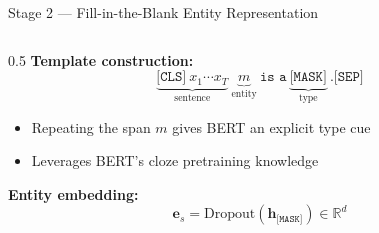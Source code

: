 \documentclass[aspectratio=169,10pt]{beamer}
\begin{document}
\begin{frame}{Stage 2 — Fill-in-the-Blank Entity Representation}
  \begin{columns}[T]
    \begin{column}{0.5\textwidth}
      \textbf{Template construction:}
      \[
        \underbrace{\texttt{[CLS]}\ x_1\cdots x_T}_{\text{sentence}}\
        \underbrace{m}_{\text{entity}}\ \texttt{is a}\
        \underbrace{\texttt{[MASK]}}_{\text{type}}\ \texttt{.[SEP]}
      \]
      \vspace{-0.3em}
      \begin{itemize}
        \item Repeating the span $m$ gives BERT an explicit type cue
        \item Leverages BERT's cloze pretraining knowledge
      \end{itemize}

      \vspace{0.5em}
      \textbf{Entity embedding:}
      \[
        \mathbf{e}_s = \mathrm{Dropout}(\mathbf{h}_{\texttt{[MASK]}}) \in \mathbb{R}^d
      \]


\end{column}
\end{columns}
\end{frame}
\end{document}

